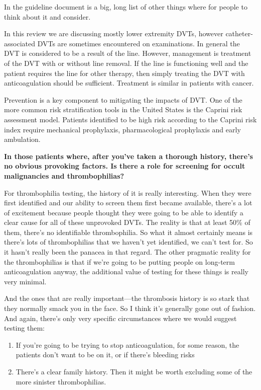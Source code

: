 \documentclass[
]{book}
\begin{document}
In the guideline document is a big, long list of other things where for
people to think about it and consider.

In this review we are discussing mostly lower extremity DVTs, however
catheter-associated DVTs are sometimes encountered on examinations. In
general the DVT is considered to be a result of the line. However,
management is treatment of the DVT with or without line removal. If the
line is functioning well and the patient requires the line for other
therapy, then simply treating the DVT with anticoagulation should be
sufficient.\citep{kearon2016, kovacs2007} Treatment is similar in patients
with cancer.\citep{debourdeau2009}

Prevention is a key component to mitigating the impacts of DVT. One of
the more common risk stratification tools in the United States is the
Caprini risk assessment model.\citep{bahl2010} Patients identified to be high
risk according to the Caprini risk index require mechanical prophylaxis,
pharmacological prophylaxis and early ambulation.\citep{gould2012, laryea2013}

\textbf{In those patients where, after you've taken a thorough history,
there's no obvious provoking factors. Is there a role for screening for
occult malignancies and thrombophilias?}

For thrombophilia testing, the history of it is really interesting. When
they were first identified and our ability to screen them first became
available, there's a lot of excitement because people thought they were
going to be able to identify a clear cause for all of these unprovoked
DVTs. The reality is that at least 50\% of them, there's no identifiable
thrombophilia. So what it almost certainly means is there's lots of
thrombophilias that we haven't yet identified, we can't test for. So it
hasn't really been the panacea in that regard. The other pragmatic
reality for the thrombophilias is that if we're going to be putting
people on long-term anticoagulation anyway, the additional value of
testing for these things is really very minimal.

And the ones that are really important---the thrombosis history is so
stark that they normally smack you in the face. So I think it's
generally gone out of fashion. And again, there's only very specific
circumstances where we would suggest testing them:

\begin{enumerate}
\def\labelenumi{\arabic{enumi}.}
\item
  If you're going to be trying to stop anticoagulation, for some
  reason, the patients don't want to be on it, or if there's bleeding
  risks
\item
  There's a clear family history. Then it might be worth excluding
  some of the more sinister thrombophilias.
\end{enumerate}
\end{document}
